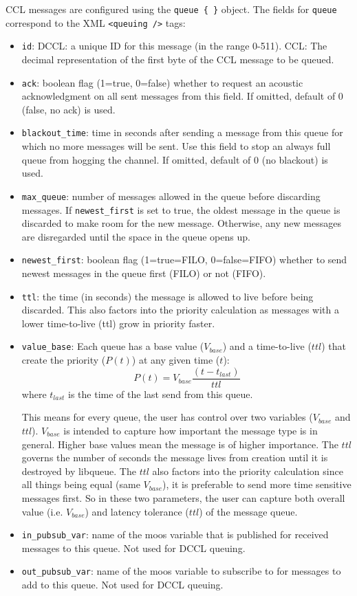 \documentclass[11pt, letterpaper, oneside]{memoir}
\begin{document}
CCL messages are configured using the \verb|queue { }| object. The fields for \verb|queue| correspond to the XML \verb|<queuing />| tags:
\begin{itemize}
\item \verb|id|: DCCL: a unique ID for this message (in the range 0-511). CCL: The decimal representation of the first byte of the CCL message to be queued. 
\item \verb|ack|: boolean flag (1=true, 0=false) whether to request an
  acoustic acknowledgment on all sent messages from this field. If
  omitted, default of 0 (false, no ack) is used.
\item \verb|blackout_time|: time in seconds after sending a message
  from this queue for which no more messages will be sent. Use this
  field to stop an always full queue from hogging the channel. If
  omitted, default of 0 (no blackout) is used.
\item \verb|max_queue|: number of messages allowed in the queue before
  discarding messages. If \verb|newest_first| is set to true, the
  oldest message in the queue is discarded to make room for the new
  message. Otherwise, any new messages are disregarded until the space
  in the queue opens up.
\item \verb|newest_first|: boolean flag (1=true=FILO, 0=false=FIFO)
  whether to send newest messages in the queue first (FILO) or not
  (FIFO).
\item \verb|ttl|: the time (in seconds) the message is allowed to live before being discarded. This also factors into the priority calculation as messages with a lower time-to-live (ttl) grow in priority faster. 
\item \verb|value_base|: 
Each queue has a base value ($V_{base}$) and a time-to-live ($ttl$) that create the priority ($P(t)$) at any given time ($t$):
 \[
P(t) = V_{base} \frac{(t-t_{last})}{ttl}
 \]
 where $t_{last}$ is the time of the last send from this queue.

This means for every queue, the user has control over two variables ($V_{base}$ and $ttl$). $V_{base}$ is intended to capture how important the message type is in general. Higher base values mean the message is of higher importance. The $ttl$ governs the number of seconds the message lives from creation until it is destroyed by libqueue. The $ttl$ also factors into the priority calculation since all things being equal (same $V_{base}$), it is preferable to send more time sensitive messages first. So in these two parameters, the user can capture both overall value (i.e. $V_{base}$) and latency tolerance ($ttl$) of the message queue.

\item \verb|in_pubsub_var|: name of the moos variable that is published for received messages to this queue. Not used for DCCL queuing.
\item \verb|out_pubsub_var|: name of the moos variable to subscribe to for
  messages to add to this queue. Not used for DCCL queuing.
\end{itemize}
\end{document}
